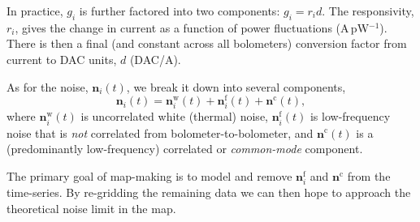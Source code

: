 \documentclass[useAMS,usenatbib,nofootinbib]{mn2e}
\begin{document}
In practice, $g_i$ is further factored into two components: $g_i = r_i
d$. The responsivity, $r_i$, gives the change in current as a function
of power fluctuations (A\,pW$^{-1}$). There is then a final (and
constant across all bolometers) conversion factor from current to DAC
units, $d$ (DAC/A).

As for the noise, $\mathbf{n}_i(t)$, we break it down into several
components,
%
\begin{equation}
  \mathbf{n}_i(t) = \mathbf{n}^\mathrm{w}_i(t) + \mathbf{n}^\mathrm{f}_i(t) +
  \mathbf{n}^\mathrm{c}(t),
\end{equation}
%
where $\mathbf{n}^\mathrm{w}_i(t)$ is uncorrelated white (thermal)
noise, $\mathbf{n}^\mathrm{f}_i(t)$ is low-frequency noise that is
\emph{not} correlated from bolometer-to-bolometer, and
$\mathbf{n}^\mathrm{c}(t)$ is a (predominantly low-frequency)
correlated or \emph{common-mode} component.

The primary goal of map-making is to model and remove
$\mathbf{n}^\mathrm{f}_i$ and $\mathbf{n}^\mathrm{c}$ from the
time-series. By re-gridding the remaining data we can then hope to
approach the theoretical noise limit in the map.
\end{document}
